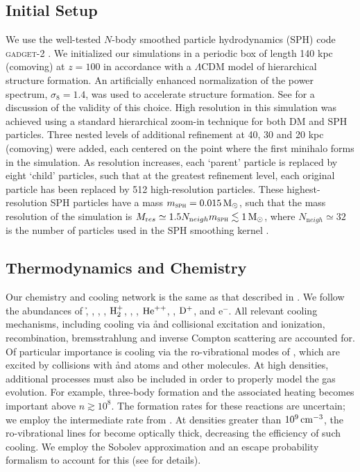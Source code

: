 \documentclass[../thesis.tex]{subfiles}
\begin{document}
\subsection{Initial Setup}
\label{xr_setup}
We use the well-tested $N$-body smoothed particle hydrodynamics (SPH) code \textsc{gadget-2} \citep{Springel2005}. We initialized our simulations in a periodic box of length 140 kpc (comoving) at $z=100$ in accordance with a $\Lambda$CDM model of hierarchical structure formation. An artificially enhanced normalization of the power spectrum, $\sigma_8 = 1.4$, was used to accelerate structure formation. See \citet{StacyGreifBromm2010} for a discussion of the validity of this choice. High resolution in this simulation was achieved using a standard hierarchical zoom-in technique for both DM and SPH particles. Three nested levels of additional refinement at 40, 30 and 20 kpc (comoving) were added, each centered on the point where the first minihalo forms in the simulation.  As resolution increases, each `parent' particle is replaced by eight `child' particles, such that at the greatest refinement level, each original particle has been replaced by 512 high-resolution particles.  These highest-resolution SPH particles have a mass $m_{\textsc{sph}} = 0.015\,\mathrm{M}_{\odot}$, such that the mass resolution of the simulation is $M_{\mathrm res} \simeq 1.5 N_{\mathrm neigh} m_{\textsc{sph}} \lesssim 1\,\mathrm{M}_{\odot}$, where $N_{\mathrm neigh} \simeq 32$ is the number of particles used in the SPH smoothing kernel \citep{BateBurkert1997}.

\subsection{Thermodynamics and Chemistry}
\label{xr_chemistry}
Our chemistry and cooling network is the same as that described in \citet{Greifetal2009b}.  We follow the abundances of \h, \hplus, \hminus, \htwo, $\mathrm{H}_2^+$, \he, \heplus, $\mathrm{He}^{++}$, \deut, $\mathrm{D}^+$, \hd and e$^-$.  All relevant cooling mechanisms, including cooling via \h and \he collisional excitation and ionization, recombination, bremsstrahlung and inverse Compton scattering are accounted for.  Of particular importance is cooling via the ro-vibrational modes of \htwo, which are excited by collisions with \h and \he atoms and other \htwo molecules.  At high densities, additional \htwo processes must also be included in order to properly model the gas evolution.  For example, three-body \htwo formation and the associated heating becomes important above $n\gtrsim10^8$\cc \citep{Turketal2011}.  The formation rates for these reactions are uncertain; we employ the intermediate rate from \citet{PallaSalpeterStahler1983}. At densities greater than \about$10^9\,\mathrm{cm}^{-3}$, the ro-vibrational lines for \htwo become optically thick, decreasing the efficiency of such cooling. We employ the Sobolev approximation and an escape probability formalism to account for this (see \citealt{Yoshidaetal2006, Greifetal2011} for details).
\end{document}
